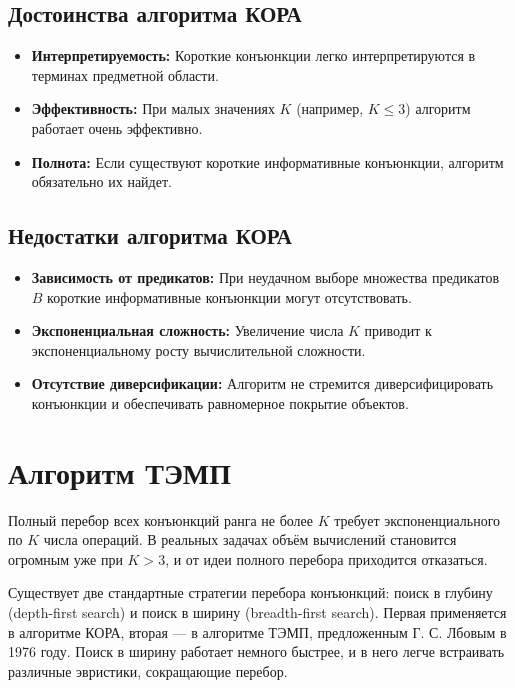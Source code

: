 \subsection{Достоинства алгоритма КОРА}

\begin{itemize}
    \item \textbf{Интерпретируемость:} Короткие конъюнкции легко интерпретируются в терминах предметной области.
    \item \textbf{Эффективность:} При малых значениях \(K\) (например, \(K \leq 3\)) алгоритм работает очень эффективно.
    \item \textbf{Полнота:} Если существуют короткие информативные конъюнкции, алгоритм обязательно их найдет.
\end{itemize}

\subsection{Недостатки алгоритма КОРА}

\begin{itemize}
    \item \textbf{Зависимость от предикатов:} При неудачном выборе множества предикатов \(B\) короткие информативные конъюнкции могут отсутствовать.
    \item \textbf{Экспоненциальная сложность:} Увеличение числа \(K\) приводит к экспоненциальному росту вычислительной сложности.
    \item \textbf{Отсутствие диверсификации:} Алгоритм не стремится диверсифицировать конъюнкции и обеспечивать равномерное покрытие объектов.
\end{itemize}

\section{Алгоритм ТЭМП}

Полный перебор всех конъюнкций ранга не более $K$ требует экспоненциального по $K$ числа операций. В реальных задачах объём вычислений становится огромным уже при $K > 3$, и от идеи полного перебора приходится отказаться.

Существует две стандартные стратегии перебора конъюнкций: поиск в глубину (depth-first search) и поиск в ширину (breadth-first search). Первая применяется в алгоритме КОРА, вторая — в алгоритме ТЭМП, предложенным Г. С. Лбовым в 1976 году. Поиск в ширину работает немного быстрее, и в него легче встраивать различные эвристики, сокращающие перебор.

